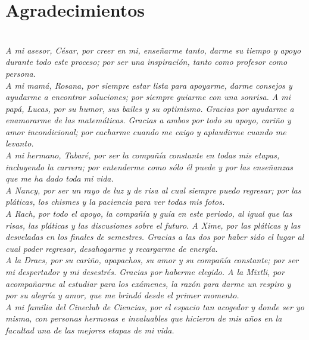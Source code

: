 \chapter*{Agradecimientos}

\textit{}\\

\textit{A mi asesor, C\'esar, por creer en mi, ense\~{n}arme tanto, darme su
tiempo y apoyo durante todo este proceso; por ser una inspiraci\'on, tanto como
profesor como persona.}\\

\textit{A mi mam\'a, Rosana, por siempre estar lista para apoyarme, darme
consejos y ayudarme a encontrar soluciones;  por siempre guiarme con una
sonrisa. A mi pap\'a, Lucas,  por su humor, sus bailes y su optimismo. Gracias
por ayudarme a enamorarme de las matem\'aticas. Gracias a ambos por todo su
apoyo, cari\~{n}o y amor incondicional; por cacharme cuando me caigo y
aplaudirme cuando me levanto.}\\

\textit{A mi hermano, Tabar\'e, por ser la compa\~{n}\'ia constante en todas mis
etapas, incluyendo la carrera; por entenderme como s\'olo \'el puede y por las
ense\~{n}anzas que me ha dado toda mi vida.}\\

\textit{A Nancy, por ser un rayo de luz y de risa al cual siempre puedo
regresar; por las pl\'aticas, los chismes y la paciencia para ver todas mis
fotos.}\\

\textit{A Rach, por todo el apoyo, la compa\~{n}\'ia y gu\'ia en este periodo, al
igual que las risas, las pl\'aticas y las discusiones sobre el futuro. A Xime,
por las pl\'aticas y las desveladas en los finales de semestres. Gracias a las
dos por haber sido el lugar al cual poder regresar, desahogarme y recargarme de
energ\'ia.} \\

\textit{A la Dracs, por su cari\~{n}o, apapachos, su amor y su compa\~{n}\'ia
constante; por ser mi despertador y mi desestr\'es. Gracias por haberme
elegido. A la Mixtli, por acompa\~{n}arme al estudiar para los ex\'amenes, la
raz\'on para darme un respiro y por su alegr\'ia y amor, que me brind\'o desde
el primer momento.}\\ 

\textit{A mi familia del Cineclub de Ciencias, por el espacio tan acogedor  y
donde ser yo misma, con personas hermosas e invaluables que hicieron de mis
a\~{n}os en la facultad una de las mejores etapas de mi vida.}\\

